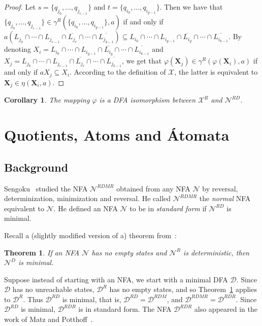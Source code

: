 \documentclass[preprint,12pt]{elsarticle}
\newcommand{\ol}{\overline}
\newcommand{\cD}{{\mathcal D}}
\newcommand{\cN}{{\mathcal N}}
\newcommand{\cX}{{\mathcal X}}
\newcommand{\rev}{R}
\newcommand{\deter}{D}
\newtheorem{theorem}{Theorem}
\newtheorem{corollary}{Corollary}
\begin{document}
\begin{proof}
Let $s=\{q_{j_0},\ldots, q_{j_{e-1}}\}$ and $t=\{q_{i_0},\ldots, q_{i_{g-1}}\}$.
Then we have that 
$\{q_{j_0},\ldots,q_{j_{e-1}}\}\in\gamma^\rev(\{q_{i_0},\ldots, q_{i_{g-1}}\},a)$ 
if and only if
$a(L_{j_0}\cap\cdots\cap L_{j_{e-1}}\cap\ol{L_{j_{e}}}\cap\cdots\cap \ol{L_{j_{k-1}}}) 
\subseteq L_{i_0}\cap\cdots\cap L_{i_{g-1}}\cap\ol{L_{i_{g}}}\cap\cdots\cap \ol{L_{i_{k-1}}}$.
By denoting $X_i=L_{i_0}\cap\cdots\cap L_{i_{g-1}}\cap\ol{L_{i_{g}}}\cap\cdots\cap \ol{L_{i_{k-1}}}$ 
and $X_j=L_{j_0}\cap\cdots\cap L_{j_{e-1}}\cap\ol{L_{j_{e}}}\cap\cdots\cap \ol{L_{j_{k-1}}}$, 
we get that $\varphi({\mathbf X}_j)\in\gamma^\rev(\varphi({\mathbf X}_i),a)$ 
if and only if $aX_j \subseteq X_i$.
According to the definition of $\cX$, the latter is equivalent to 
${\mathbf X}_j \in \eta({\mathbf X}_i, a)$.
\end{proof}


\begin{corollary}
\label{cor:nfa_isomorphism}
The mapping $\varphi$ is a DFA isomorphism between $\cX^\rev$ and 
$\cN^{\rev\deter}$.
\end{corollary}



\section{Quotients, Atoms and \'Atomata}
\label{sec:atoms}

\subsection{Background}
Sengoku~\cite{Sen92} studied the NFA $\cN^{RDMR}$ obtained from any NFA $\cN$ by reversal, determinization, minimization and  reversal.  He called $\cN^{RDMR}$ the \emph{normal} NFA equivalent to $\cN$. He defined an NFA $\cN$ to be in \emph{standard form}
if $\cN^{RD}$ is minimal. 

Recall a (slightly modified version of a) theorem from~\cite{Brz63}:
\begin{theorem}
\label{thm:Brz}
If  an NFA $\cN$ has no empty states and $\cN^\rev$ is deterministic, 
then $\cN^\deter$ is minimal.
\end{theorem}

Suppose instead of starting with an NFA, we start with a minimal DFA $\cD$. 
Since $\cD$ has no unreachable states, $\cD^R$ has no empty states, and 
so Theorem~\ref{thm:Brz} applies to $\cD^R$. Thus 
$\cD^{RD}$ is minimal, that is, $\cD^{RD}=\cD^{RDM}$, and $\cD^{RDMR}=\cD^{RDR}$.
Since $\cD^{RD}$ is minimal, $\cD^{RDR}$ is in standard form.
The NFA $\cD^{RDR}$ also appeared in the work of Matz and Potthoff~\cite{MaPo95}.
\end{document}
